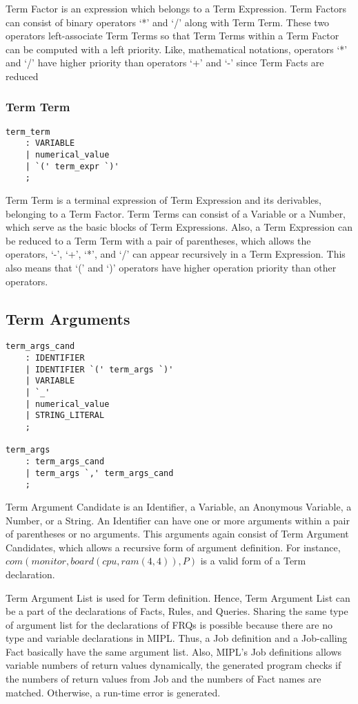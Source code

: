 \documentclass[prodmode,acmtecs]{acmsmall}
\begin{document}
Term Factor is an expression which belongs to a Term Expression.  Term 
Factors can consist of binary operators `*' and `/' along with Term
Term.  These two operators left-associate Term Terms so that Term
Terms within a Term Factor can be computed with a left priority. Like,
mathematical notations, operators `*' and `/' have higher priority than
operators `+' and `-' since Term Facts are reduced 
\medskip


\subsubsection{Term Term}
\begin{lstlisting}
term_term
	: VARIABLE
	| numerical_value
	| `(' term_expr `)'
	;
\end{lstlisting}

Term Term is a terminal expression of Term Expression and its derivables,
belonging to a Term Factor.  Term Terms can consist of a Variable or a
Number, which serve as the basic blocks of Term Expressions.  Also, a Term
Expression can be reduced to a Term Term with a pair of parentheses, which
allows the operators, `-', `+', `*', and `/' can appear recursively in a
Term Expression.  This also means that `(' and `)' operators have higher
operation priority than other operators.
\medskip

\subsection{Term Arguments}

\begin{lstlisting}
term_args_cand
	: IDENTIFIER
	| IDENTIFIER `(' term_args `)'
	| VARIABLE
	| `_'
	| numerical_value
	| STRING_LITERAL
	;

term_args
	: term_args_cand
	| term_args `,' term_args_cand
	;

\end{lstlisting}

Term Argument Candidate is an Identifier, a Variable, an Anonymous
Variable, a Number, or a String.  An Identifier can have one
or more arguments within a pair of parentheses or no arguments.
This arguments again consist of Term Argument Candidates, which
allows a recursive form of argument definition.  For instance, 
$com(monitor, board(cpu, ram(4, 4)), P)$ is a valid form
of a Term declaration.

Term Argument List is used for Term definition. Hence, Term
Argument List can be a part of the declarations of Facts, Rules,
and Queries.  Sharing the same type of argument list for the
declarations of FRQs is possible because there are no type and
variable declarations in MIPL.  Thus, a Job definition and
a Job-calling Fact basically have the same argument list.
Also, MIPL's Job definitions allows variable numbers of return
values dynamically, the generated program
checks if the numbers of return values from Job and the numbers of
Fact names are matched.  Otherwise, a run-time error is generated.
\medskip
\end{document}
